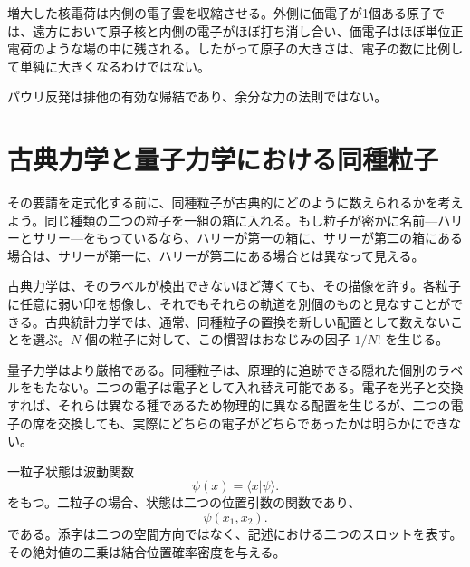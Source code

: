増大した核電荷は内側の電子雲を収縮させる。外側に価電子が1個ある原子では、遠方において原子核と内側の電子がほぼ打ち消し合い、価電子はほぼ単位正電荷のような場の中に残される。したがって原子の大きさは、電子の数に比例して単純に大きくなるわけではない。

\begin{classroomqa}
\end{classroomqa}

パウリ反発は排他の有効な帰結であり、余分な力の法則ではない。

\begin{classroomqa}
\end{classroomqa}

\section{古典力学と量子力学における同種粒子}

その要請を定式化する前に、同種粒子が古典的にどのように数えられるかを考えよう。同じ種類の二つの粒子を一組の箱に入れる。もし粒子が密かに名前---ハリーとサリー---をもっているなら、ハリーが第一の箱に、サリーが第二の箱にある場合は、サリーが第一に、ハリーが第二にある場合とは異なって見える。

古典力学は、そのラベルが検出できないほど薄くても、その描像を許す。各粒子に任意に弱い印を想像し、それでもそれらの軌道を別個のものと見なすことができる。古典統計力学では、通常、同種粒子の置換を新しい配置として数えないことを選ぶ。\(N\) 個の粒子に対して、この慣習はおなじみの因子 \(1/N!\) を生じる。

量子力学はより厳格である。同種粒子は、原理的に追跡できる隠れた個別のラベルをもたない。二つの電子は電子として入れ替え可能である。電子を光子と交換すれば、それらは異なる種であるため物理的に異なる配置を生じるが、二つの電子の席を交換しても、実際にどちらの電子がどちらであったかは明らかにできない。

一粒子状態は波動関数
\[
\psi(x)=\langle x\vert\psi\rangle.
\]
をもつ。二粒子の場合、状態は二つの位置引数の関数であり、
\begin{equation}
\psi(x_{1},x_{2}).
\end{equation}
である。添字は二つの空間方向ではなく、記述における二つのスロットを表す。その絶対値の二乗は結合位置確率密度を与える。

